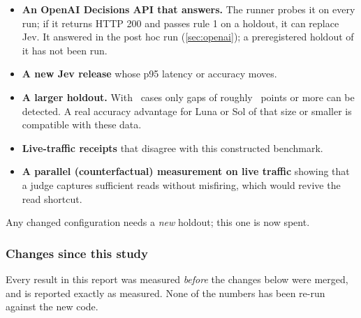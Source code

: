 \begin{itemize}
  \item \textbf{An OpenAI Decisions API that answers.} The runner probes it on every run; if it returns
    HTTP 200 and passes rule 1 on a holdout, it can replace Jev. It answered in the post hoc run (\cref{sec:openai});
    a preregistered holdout of it has not been run.
  \item \textbf{A new Jev release} whose p95 latency or accuracy moves.
  \item \textbf{A larger holdout.} With \HoldN\ cases only gaps of roughly \HoldMinDetectPts\ points or
    more can be detected. A real accuracy advantage for Luna or Sol of that size or smaller is
    compatible with these data.
  \item \textbf{Live-traffic receipts} that disagree with this constructed benchmark.
  \item \textbf{A parallel (counterfactual) measurement on live traffic} showing that a judge captures
    sufficient reads without misfiring, which would revive the read shortcut.
\end{itemize}
Any changed configuration needs a \emph{new} holdout; this one is now spent.

\subsubsection{Changes since this study}\label{jb:sec:since}

\begin{caution}[title={Measured before these changes}]
Every result in this report was measured \emph{before} the changes below were merged, and is reported
exactly as measured. None of the numbers has been re-run against the new code.
\end{caution}

